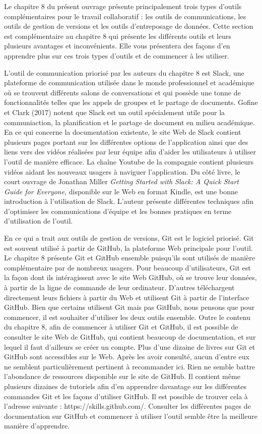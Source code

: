 \documentclass[
  letterpaper,
  DIV=11,
  numbers=noendperiod]{scrreprt}
\begin{document}
Le chapitre 8 du présent ouvrage présente principalement trois types
d'outils complémentaires pour le travail collaboratif : les outils de
communications, les outils de gestion de versions et les outils
d'entreposage de données. Cette section est complémentaire au chapitre 8
qui présente les différents outils et leurs plusieurs avantages et
inconvénients. Elle vous présentera des façons d'en apprendre plus sur
ces trois types d'outils et de commencer à les utiliser.

L'outil de communication priorisé par les auteurs du chapitre 8 est
Slack, une plateforme de communication utilisée dans le monde
professionnel et académique où se trouvent différents salons de
conversations et qui possède une tonne de fonctionnalités telles que les
appels de groupes et le partage de documents. Gofine et Clark (2017)
notent que Slack est un outil spécialement utile pour la communiaction,
la planification et le partage de document en milieu académique. En ce
qui concerne la documentation existente, le site Web de Slack contient
plusieurs pages portant sur les différentes options de l'application
ainsi que des liens vers des vidéos réalisées par leur équipe afin
d'aider les utilisateurs à utiliser l'outil de manière efficace. La
chaîne Youtube de la compagnie contient plusieurs vidéos aidant les
nouveaux usagers à naviguer l'application. Du côté livre, le court
ouvrage de Jonathan Miller \emph{Getting Started with Slack: A Quick
Start Guide for Everyone}, disponible sur le Web en format Kindle, est
une bonne introduction à l'utilisation de Slack. L'auteur présente
différentes techniques afin d'optimiser les communications d'équipe et
les bonnes pratiques en terme d'utilisation de l'outil.

En ce qui a trait aux outils de gestion de versions, Git est le logiciel
priorisé. Git est souvent utilisé à partir de GitHub, la plateforme Web
principale pour l'outil. Le chapitre 8 présente Git et GitHub ensemble
puisqu'ils sont utilisés de manière complémentaire par de nombreux
usagers. Pour beaucoup d'utilisateurs, Git est la façon dont ils
intéragissent avec le site Web GitHub, où se trouve leur données, à
partir de la ligne de commande de leur ordinateur. D'autres téléchargent
directement leurs fichiers à partir du Web et utilisent Git à partir de
l'interface GitHub. Bien que certains utilisent Git mais pas GitHub,
nous pensons que pour commencer, il est souhaiter d'utiliser les deux
outils ensemble. Outre le contenu du chapitre 8, afin de commencer à
utiliser Git et GitHub, il est possible de consulter le site Web de
GitHub, qui contient beaucoup de documentation, et sur lequel il faut
d'ailleurs se créer un compte. Plus d'une dizaine de livres sur Git et
GitHub sont accessibles sur le Web. Après les avoir consulté, aucun
d'entre eux ne semblent particulièrement pertinent à recommander ici.
Rien ne semble battre l'abondance de ressources disponible sur le site
de GitHub. Il contient même plusieurs dizaines de tutoriels afin d'en
apprendre davantage sur les différentes commandes Git et les façons
d'utiliser GitHub. Il est possible de trouver cela à l'adresse suivante
: https://skills.github.com/. Consulter les différentes pages de
documentation sur GitHub et commencer à utiliser l'outil semble être la
meilleure manière d'apprendre.
\end{document}
